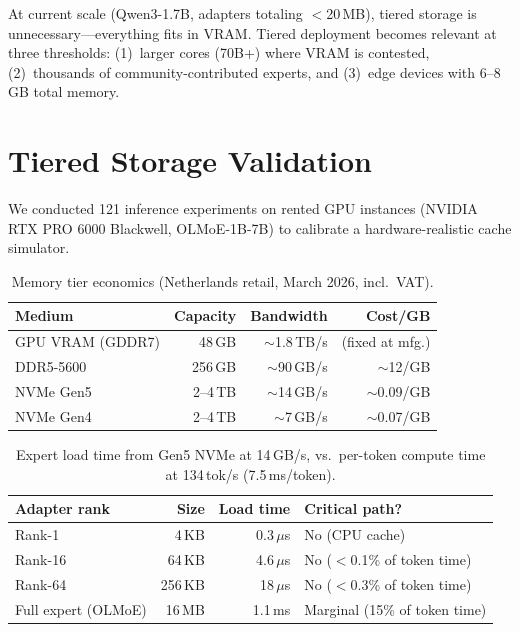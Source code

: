 \documentclass{article}
\begin{document}
At current scale (Qwen3-1.7B, adapters totaling $<$20\,MB), tiered storage is
unnecessary---everything fits in VRAM. Tiered deployment becomes relevant at
three thresholds: (1)~larger cores (70B+) where VRAM is contested,
(2)~thousands of community-contributed experts, and (3)~edge devices with
6--8\,GB total memory.

\section{Tiered Storage Validation}
\label{app:tiered}

We conducted 121 inference experiments on rented GPU instances (NVIDIA RTX PRO
6000 Blackwell, OLMoE-1B-7B) to calibrate a hardware-realistic cache simulator.

\begin{table}[h]
\centering
\caption{Memory tier economics (Netherlands retail, March 2026, incl.\ VAT).}
\label{tab:tiers}
\begin{tabular}{@{}lrrr@{}}
\toprule
Medium & Capacity & Bandwidth & Cost/GB \\
\midrule
GPU VRAM (GDDR7) & 48\,GB & $\sim$1.8\,TB/s & (fixed at mfg.) \\
DDR5-5600 & 256\,GB & $\sim$90\,GB/s & $\sim$\texteuro{}12/GB \\
NVMe Gen5 & 2--4\,TB & $\sim$14\,GB/s & $\sim$\texteuro{}0.09/GB \\
NVMe Gen4 & 2--4\,TB & $\sim$7\,GB/s & $\sim$\texteuro{}0.07/GB \\
\bottomrule
\end{tabular}
\end{table}

\begin{table}[h]
\centering
\caption{Expert load time from Gen5 NVMe at 14\,GB/s, vs.\ per-token compute
time at 134\,tok/s (7.5\,ms/token).}
\label{tab:load-times}
\begin{tabular}{@{}lrrl@{}}
\toprule
Adapter rank & Size & Load time & Critical path? \\
\midrule
Rank-1 & 4\,KB & 0.3\,$\mu$s & No (CPU cache) \\
Rank-16 & 64\,KB & 4.6\,$\mu$s & No ($<$0.1\% of token time) \\
Rank-64 & 256\,KB & 18\,$\mu$s & No ($<$0.3\% of token time) \\
Full expert (OLMoE) & 16\,MB & 1.1\,ms & Marginal (15\% of token time) \\
\bottomrule
\end{tabular}
\end{table}
\end{document}
